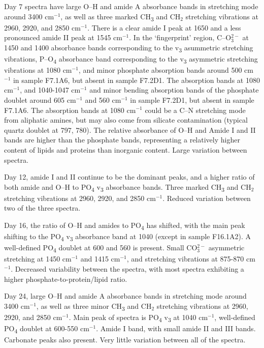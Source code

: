 \documentclass[
]{article}
\begin{document}
Day 7 spectra have large O--H and amide A absorbance bands in stretching
mode around 3400 cm\(^{-1}\), as well as three marked
CH\textsubscript{3} and CH\(_2\) stretching vibrations at 2960, 2920,
and 2850 cm\(^{-1}\). There is a clear amide I peak at 1650 and a less
pronounced amide II peak at 1545 cm\(^{-1}\). In the `fingerprint'
region, C--O\(_3^{2-}\) at 1450 and 1400 absorbance bands corresponding
to the v\textsubscript{3} asummetric stretching vibrations,
P--O\textsubscript{4} absorbance band corresponding to the
v\textsubscript{3} asymmetric stretching vibrations at 1080 cm\(^{-1}\),
and minor phosphate absorption bands around 500 cm\(^{-1}\) in sample
F7.1A6, but absent in sample F7.2D1. The absorption bands at 1080
cm\(^{-1}\), and 1040-1047 cm\(^{-1}\) and minor bending absorption
bands of the phosphate doublet around 605 cm\(^{-1}\) and 560
cm\(^{-1}\) in sample F7.2D1, but absent in sample F7.1A6. The
absorption bands at 1080 cm\(^{-1}\) could be a C--N stretching mode
from aliphatic amines, but may also come from silicate contamination
(typical quartz doublet at 797, 780). The relative absorbance of O--H
and Amide I and II bands are higher than the phosphate bands,
representing a relatively higher content of lipids and proteins than
inorganic content. Large variation between spectra.

Day 12, amide I and II continue to be the dominant peaks, and a higher
ratio of both amide and O--H to PO\textsubscript{4} v\textsubscript{3}
absorbance bands. Three marked CH\textsubscript{3} and CH\(_2\)
stretching vibrations at 2960, 2920, and 2850 cm\(^{-1}\). Reduced
variation between two of the three spectra.

Day 16, the ratio of O--H and amides to PO\textsubscript{4} has shifted,
with the main peak shifting to the PO\textsubscript{4}
v\textsubscript{3} absorbance band at 1040 (except in sample F16.1A2). A
well-defined PO\textsubscript{4} doublet at 600 and 560 is present.
Small CO\(_3^{2-}\) asymmetric stretching at 1450 cm\(^{-1}\) and 1415
cm\(^{-1}\), and stretching vibrations at 875-870 cm\(^{-1}\). Decreased
variability between the spectra, with most spectra exhibiting a higher
phosphate-to-protein/lipid ratio.

Day 24, large O--H and amide A absorbance bands in stretching mode
around 3400 cm\(^{-1}\), as well as three minor CH\textsubscript{3} and
CH\(_2\) stretching vibrations at 2960, 2920, and 2850 cm\(^{-1}\). Main
peak of spectra is PO\textsubscript{4} v\textsubscript{3} at 1040
cm\(^{-1}\), well-defined PO\textsubscript{4} doublet at 600-550
cm\(^{-1}\). Amide I band, with small amide II and III bands. Carbonate
peaks also present. Very little variation between all of the spectra.
\end{document}
